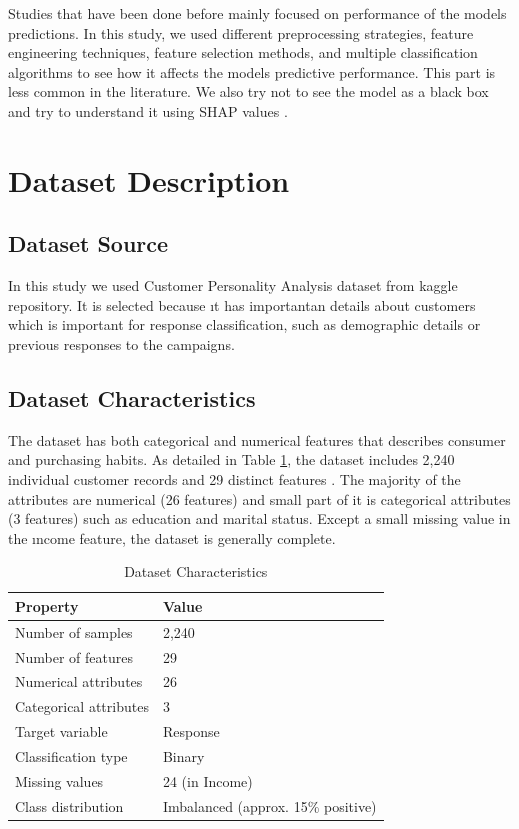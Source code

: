 \documentclass[conference]{IEEEtran}
\begin{document}
Studies that have been done before mainly focused on performance of the models predictions.
In this study, we used different preprocessing strategies, feature engineering techniques, feature selection methods, and multiple classification algorithms to see how it affects the models predictive performance. This part is less common in the literature.
We also try not to see the model as a black box and try to understand it using SHAP values \cite{lundberg2017}.

\section{Dataset Description}
\label{sec:dataset}

\subsection{Dataset Source}
In this study we used Customer Personality Analysis dataset from kaggle repository. It is selected because ıt has importantan details about customers which is important for response classification, such as demographic details or previous responses to the campaigns.


\subsection{Dataset Characteristics}
The dataset has both  categorical and numerical features that describes consumer and purchasing habits. 
As detailed in Table \ref{tab:dataset_characteristics}, the dataset includes 2,240 individual customer records and 29 distinct features . 
The majority of the attributes are numerical (26 features) and small part of it is categorical attributes (3 features) such as education and marital status. 
Except a small missing value in the ıncome feature, the dataset is generally complete.

\begin{table}[htbp]
\caption{Dataset Characteristics}
\label{tab:dataset_characteristics}
\centering
\begin{tabular}{|l|l|}
\hline
\textbf{Property} & \textbf{Value} \\
\hline
Number of samples & 2,240 \\
Number of features & 29 \\
Numerical attributes & 26 \\
Categorical attributes & 3 \\
Target variable & Response \\
Classification type & Binary \\
Missing values & 24 (in Income) \\
Class distribution & Imbalanced (approx. 15\% positive) \\
\hline
\end{tabular}
\end{table}
\end{document}
